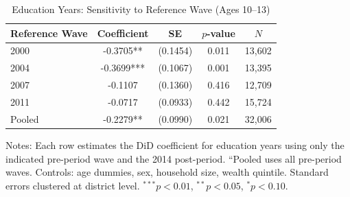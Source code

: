 \begin{table}[H]
\centering
\caption{Education Years: Sensitivity to Reference Wave (Ages 10--13)}
\label{tab:edyears_wave}
\begin{threeparttable}
\begin{tabular}{lcccc}
\toprule
Reference Wave & Coefficient & SE & $p$-value & $N$ \\
\midrule
2000 & -0.3705** & (0.1454) & 0.011 & 13,602 \\
2004 & -0.3699*** & (0.1067) & 0.001 & 13,395 \\
2007 & -0.1107 & (0.1360) & 0.416 & 12,709 \\
2011 & -0.0717 & (0.0933) & 0.442 & 15,724 \\
Pooled & -0.2279** & (0.0990) & 0.021 & 32,006 \\
\bottomrule
\end{tabular}
\begin{tablenotes}
\footnotesize
\item Notes: Each row estimates the DiD coefficient for education years using only the indicated pre-period wave and the 2014 post-period. ``Pooled uses all pre-period waves. Controls: age dummies, sex, household size, wealth quintile. Standard errors clustered at district level. $^{***}p<0.01$, $^{**}p<0.05$, $^{*}p<0.10$.
\end{tablenotes}
\end{threeparttable}
\end{table}
